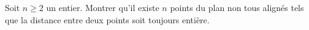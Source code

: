 Soit $n\ge 2$ un entier. Montrer qu'il existe $n$ points du plan non tous alignés tels que la distance entre deux points soit toujours entière.